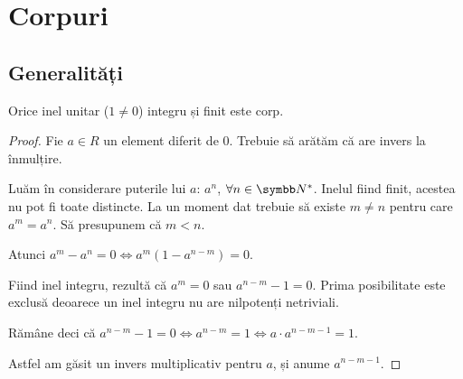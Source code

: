 \section{Corpuri}

\subsection{Generalități}

\begin{exercise}[1.4]
Orice inel unitar (\(1 \neq 0\)) integru și finit este corp.
\end{exercise}
\begin{proof}
Fie \(a \in R\) un element diferit de 0. Trebuie să arătăm că are invers la înmulțire.

Luăm în considerare puterile lui \(a\): \(a^n\), \(\forall n \in \naturals^*\). Inelul fiind finit, acestea nu pot fi toate distincte. La un moment dat trebuie să existe \(m \neq n\) pentru care \(a^m = a^n\). Să presupunem că \(m < n\).

Atunci \(a^m - a^n = 0 \iff a^m(1 - a^{n - m}) = 0\).

Fiind inel integru, rezultă că \(a^m = 0\) sau \(a^{n - m} - 1 = 0\). Prima posibilitate este exclusă deoarece un inel integru nu are nilpotenți netriviali.

Rămâne deci că \(a^{n - m} - 1 = 0 \iff a^{n - m} = 1 \iff a \cdot a^{n - m - 1} = 1\).

Astfel am găsit un invers multiplicativ pentru \(a\), și anume \(a^{n - m - 1}\).
\end{proof}

